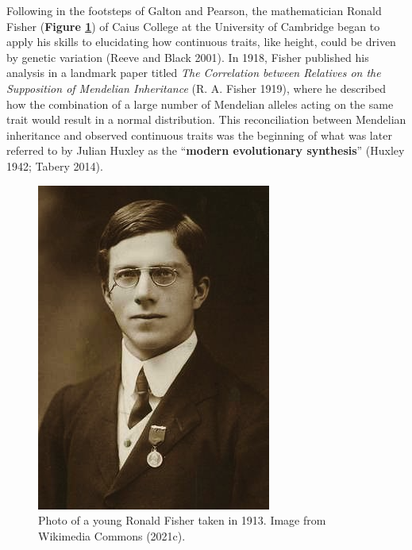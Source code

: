 \documentclass[
]{book}
\begin{document}
Following in the footsteps of Galton and Pearson, the mathematician Ronald Fisher (\textbf{Figure \ref{fig:fisher}}) of Caius College at the University of Cambridge began to apply his skills to elucidating how continuous traits, like height, could be driven by genetic variation (Reeve and Black 2001). In 1918, Fisher published his analysis in a landmark paper titled \emph{The Correlation between Relatives on the Supposition of Mendelian Inheritance} (R. A. Fisher 1919), where he described how the combination of a large number of Mendelian alleles acting on the same trait would result in a normal distribution. This reconciliation between Mendelian inheritance and observed continuous traits was the beginning of what was later referred to by Julian Huxley as the ``\textbf{modern evolutionary synthesis}'' (Huxley 1942; Tabery 2014).



\begin{figure}

{\centering \includegraphics[width=0.7\linewidth]{figs/introduction/Youngronaldfisher2} 

}

\caption{Photo of a young Ronald Fisher taken in 1913. Image from Wikimedia Commons (2021c).}\label{fig:fisher}
\end{figure}
\end{document}
